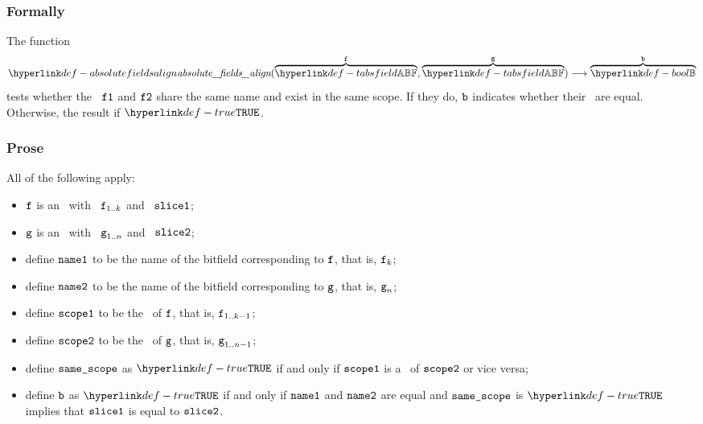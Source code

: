 \subsubsection{Formally}
\begin{mathpar}
\end{mathpar}

\hypertarget{def-absolutefieldsalign}{}
The function
\[
\absolutefieldsalign(\overname{\TAbsField}{\vf}, \overname{\TAbsField}{\vg})
\aslto \overname{\Bool}{\vb}
\]
tests whether the \absolutebitfields\ $\vfone$ and $\vftwo$ share the same name
and exist in the same scope. If they do, $\vb$ indicates whether their \absoluteslices\
are equal. Otherwise, the result if $\True$.

\subsubsection{Prose}
All of the following apply:
\begin{itemize}
  \item $\vf$ is an \absolutebitfield\ with \absolutename\ $\vf_{1..k}$ and \absoluteslice\ $\vsliceone$;
  \item $\vg$ is an \absolutebitfield\ with \absolutename\ $\vg_{1..n}$ and \absoluteslice\ $\vslicetwo$;
  \item define $\nameone$ to be the name of the bitfield corresponding to $\vf$, that is, $\vf_k$;
  \item define $\nametwo$ to be the name of the bitfield corresponding to $\vg$, that is, $\vg_n$;
  \item define $\vscopeone$ to be the \bitfieldscope\ of $\vf$, that is, $\vf_{1..k-1}$;
  \item define $\vscopetwo$ to be the \bitfieldscope\ of $\vg$, that is, $\vg_{1..n-1}$;
  \item define $\vsamescope$ as $\True$ if and only if $\vscopeone$ is a \listprefixterm\ of $\vscopetwo$ or vice versa;
  \item define $\vb$ as $\True$ if and only if $\nameone$ and $\nametwo$ are equal and $\vsamescope$ is $\True$ implies
        that $\vsliceone$ is equal to $\vslicetwo$.
\end{itemize}

